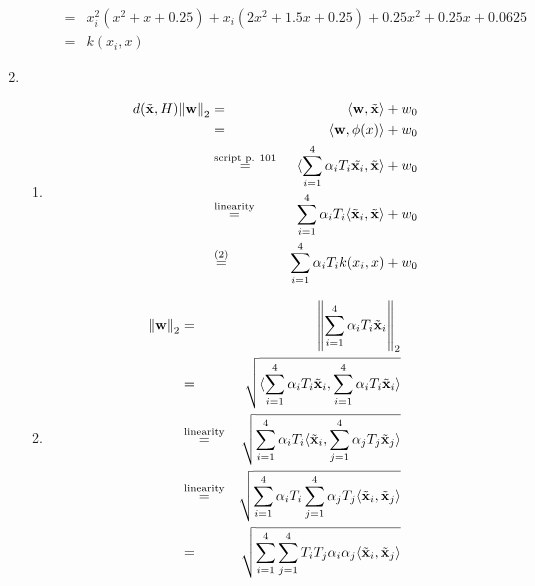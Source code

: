\documentclass[DIN, pagenumber=false, fontsize=11pt, parskip=half]{scrartcl}
\begin{document}
\begin{enumerate}
\begin{enumerate}[label=\alph*)]
\begin{eqnarray*}
                            &=& x_i^2 (x^2 + x + 0.25)
                                + x_i (2 x^2 + 1.5 x + 0.25)
                                + 0.25 x^2 + 0.25 x + 0.0625 \\
                            &=& k(x_i, x)
                    \end{eqnarray*}
            \end{enumerate}
            \setcounter{enumi}{5}
        \item
        \begin{enumerate}
            \item
                \begin{eqnarray*}
                    d(\tilde{\mathbf{x}}, H) \norm{\mathbf{w}}_2 &=& \langle \mathbf{w} , \tilde{\mathbf{x} } \rangle + w_0 \\
                        &=& \langle \mathbf{w} , \phi(x) \rangle + w_0 \\
                        &\stackrel{\text{script p. 101}}{=}& \langle \sum_{i=1}^4 \alpha_i T_i \tilde{\mathbf{x} _i}, \tilde{\mathbf{x} }\rangle  + w_0 \\
                        &\stackrel{\text{linearity}}{=}& \sum_{i=1}^4 \alpha_i T_i \langle \tilde{\mathbf{x} }_i, \tilde{\mathbf{x} }\rangle  + w_0 \\
                        &\stackrel{\text{(2)}}{=}& \sum_{i=1}^4 \alpha_i T_i k(x_i,x) + w_0
                \end{eqnarray*}
            \item
                \begin{eqnarray*}
                    \norm{\mathbf{w} }_2 &=& \norm{\sum_{i=1}^4 \alpha_i T_i \tilde{\mathbf{x} }_i}_2 \\
                        &=& \sqrt{\langle \sum_{i=1}^4 \alpha_i T_i \tilde{\mathbf{x} }_i, \sum_{i=1}^4 \alpha_i T_i \tilde{\mathbf{x} }_i\rangle } \\
                        &\stackrel{\text{linearity}}{=}& \sqrt{\sum_{i=1}^4 \alpha_i T_i \langle \tilde{\mathbf{x} }_i, \sum_{j=1}^4 \alpha_j T_j \tilde{\mathbf{x} }_j\rangle } \\
                        &\stackrel{\text{linearity}}{=}& \sqrt{\sum_{i=1}^4 \alpha_i T_i \sum_{j=1}^4 \alpha_j T_j \langle \tilde{\mathbf{x} }_i, \tilde{\mathbf{x} }_j\rangle } \\
                        &=& \sqrt{\sum_{i=1}^4 \sum_{j=1}^4 T_i T_j \alpha_i \alpha_j \langle \tilde{\mathbf{x} }_i, \tilde{\mathbf{x} }_j\rangle } \\
                \end{eqnarray*}
        \end{enumerate}
    \end{enumerate}
\end{document}
